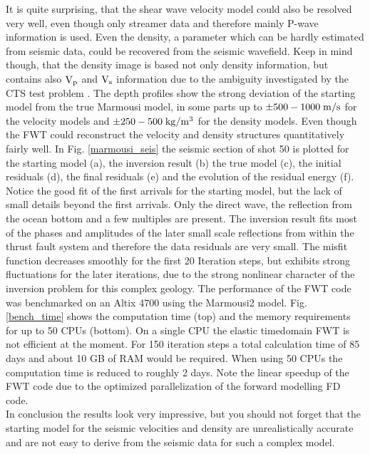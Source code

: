 It is quite surprising, that the shear wave velocity model could also be resolved very well, even though only streamer data and therefore mainly P-wave information is used. Even the density, a parameter which can be hardly estimated from seismic data, could be recovered from the seismic wavefield. Keep in mind though, that the density image is based not only density information, but contains also $\rm{V_p}$ and $\rm{V_s}$ information due to the ambiguity investigated by the CTS test problem \citep[chapter 5.2]{koehn:11}. The depth profiles show the strong deviation of the starting model from the true Marmousi model, in some parts up to $\rm{\pm 500-1000\;m/s}$ for the velocity models and $\rm{\pm 250-500\;kg/m^3}$ for the density models. Even though the FWT could reconstruct the velocity and density structures quantitatively fairly well. In Fig. \ref{marmousi_seis} the seismic section of shot 50 is plotted for the starting model (a), the inversion result (b) the true model (c), the initial residuals (d), the final residuals (e) and the evolution of the residual energy (f). Notice the good fit of the first arrivals for the starting model, but the lack of small details beyond the first arrivals. Only the direct wave, the reflection from the ocean bottom and a few multiples are present. The inversion result fits most of the phases and amplitudes of the later small scale reflections from within the thrust fault system and therefore the data residuals are very small. The misfit function decreases smoothly for the first 20 Iteration steps, but exhibits strong fluctuations for the later iterations, due to the strong nonlinear character of the inversion problem for this complex geology.  
The performance of the FWT code was benchmarked on an Altix 4700 using the Marmousi2 model. Fig.\ref{bench_time} shows the computation time (top) and the memory requirements for up to 50 CPUs (bottom). On a single CPU the elastic timedomain FWT is not efficient at the moment. For 150 iteration steps a total calculation time of 85 days and about 10 GB of RAM would be required. When using 50 CPUs the computation 
time is reduced to roughly 2 days. Note the linear speedup of the FWT code due to the optimized parallelization of the forward modelling FD code.\\ 
In conclusion the results look very impressive, but you should not forget that the starting model for the seismic velocities and density are unrealistically accurate and are not easy to derive from the seismic data for such a complex model. 
